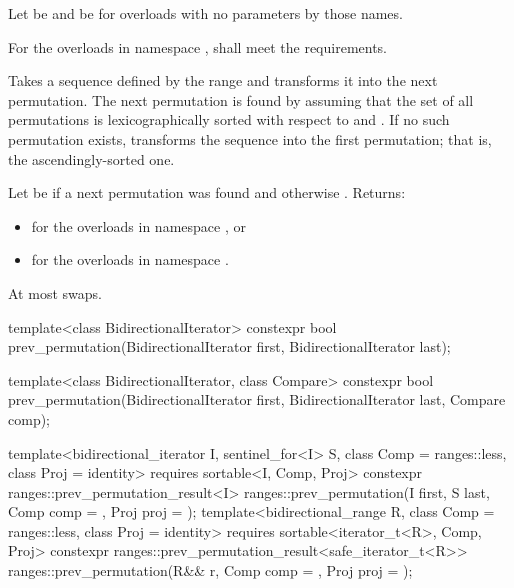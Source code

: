 \begin{itemdescr}
\pnum
Let  be 
and  be 
for overloads with no parameters by those names.

\pnum
\requires
For the overloads in namespace ,
 shall meet
the  requirements.

\pnum
\effects
Takes a sequence defined by the range 
and transforms it into the next permutation.
The next permutation is found by assuming that the set of all permutations
is lexicographically sorted with respect to  and .
If no such permutation exists,
transforms the sequence into the first permutation;
that is, the ascendingly-sorted one.

\pnum
\returns
Let  be  if a next permutation was found and
otherwise .
Returns:
\begin{itemize}
\item {} for the overloads in namespace , or
\item {} for the overloads in namespace .
\end{itemize}

\pnum
\complexity
At most  swaps.
\end{itemdescr}

%
\begin{itemdecl}
template<class BidirectionalIterator>
  constexpr bool prev_permutation(BidirectionalIterator first,
                                  BidirectionalIterator last);

template<class BidirectionalIterator, class Compare>
  constexpr bool prev_permutation(BidirectionalIterator first,
                                  BidirectionalIterator last, Compare comp);

template<bidirectional_iterator I, sentinel_for<I> S, class Comp = ranges::less,
         class Proj = identity>
  requires sortable<I, Comp, Proj>
  constexpr ranges::prev_permutation_result<I>
    ranges::prev_permutation(I first, S last, Comp comp = {}, Proj proj = {});
template<bidirectional_range R, class Comp = ranges::less,
         class Proj = identity>
  requires sortable<iterator_t<R>, Comp, Proj>
  constexpr ranges::prev_permutation_result<safe_iterator_t<R>>
    ranges::prev_permutation(R&& r, Comp comp = {}, Proj proj = {});
\end{itemdecl}

